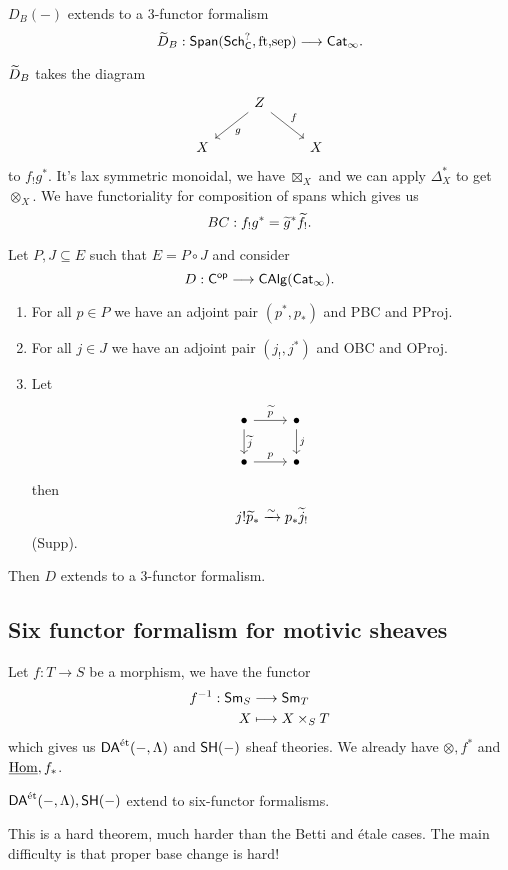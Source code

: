 \begin{fact}
	$D_B(-)$ extends to a 3-functor formalism
	\[
		\wt{D}_B:\cat{Span}(\cat{Sch}_\C^{?},\text{ft,sep})\to \cat{Cat}_\infty.
	\] 
\end{fact}
$\widetilde{D}_B$ takes the diagram
\[
\begin{tikzcd}
	 & Z \ar[dl,"g"] \ar[dr,"f"] \\
	X & & X
\end{tikzcd}
\] 
to $f_!g^{*}$. It's lax symmetric monoidal, we have $\boxtimes_X$ and we can apply $\Delta_X^{*}$ to get $\otimes_X$. We have functoriality for composition of spans which gives us
\[
	BC:f_!g^{*} = \widetilde{g}^{*}\widetilde{f}_!.
\] 
\begin{theorem}[Fake]
	Let $P,J\subseteq E$ such that $E=P\circ J$ and consider
	\[
		D:\C\op \to \cat{CAlg}(\cat{Cat}_\infty).
	\] 
	\begin{enumerate}[1)]
		\item For all $p\in P$ we have an adjoint pair $(p^{*},p_*)$ and PBC and PProj.
		\item For all $j\in J$ we have an adjoint pair $(j_!,j^{*})$ and OBC and OProj.
		\item Let
			\[
			\begin{tikzcd}
				\bullet \ar[r,"\wt{p}"] \ar[d,"\wt{j}"] & \bullet \ar[d,"j"] \\
				\bullet \ar[r,"p"] & \bullet
			\end{tikzcd}
		\]
		then
		\[
			j!\widetilde{p}_* \xrightarrow{\sim} p_*\widetilde{j}_!
		\] 
		(Supp).
	\end{enumerate}
	Then $D$ extends to a 3-functor formalism.
\end{theorem}
\subsection{Six functor formalism for motivic sheaves}
Let $f:T\to S$ be a morphism, we have the functor
\begin{align*}
	f^{-1}: \mathsf{Sm}_S &\longrightarrow \mathsf{Sm}_T \\
	X &\longmapsto X\times_S T
\end{align*}
which gives us $\mathsf{DA}^\text{\'et}(-,\Lambda)$ and $\mathsf{SH}(-)$ sheaf theories. We already have $\otimes, f^{*}$ and $\underline{\operatorname{Hom}},f_*$.
\begin{theorem}
	$\mathsf{DA}^\text{\'et}(-,\Lambda), \mathsf{SH}(-)$ extend to six-functor formalisms.
\end{theorem}
This is a hard theorem, much harder than the Betti and \'etale cases. The main difficulty is that proper base change is hard!

